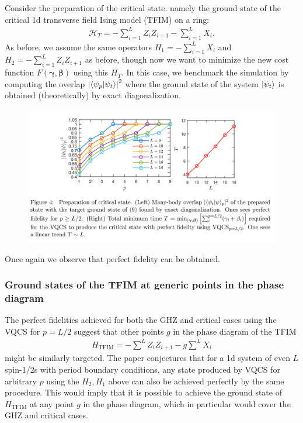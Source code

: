 \documentclass{book}
\theoremstyle{definition}
\newcommand{\had}{\mathcal{H}}
\begin{document}
Consider the preparation of the critical state. namely the ground state of the critical 1d transverse field Ising model (TFIM) on a ring:
\begin{align}
\had_T = -\sum^L_{i=1}Z_i Z_{i+1} - \sum^L_{i=1}X_i.
\end{align}
As before, we assume the same operators $H_1 = -\sum^L_{i=1}X_i$ and $H_2 = -\sum^L_{i=1} Z_i Z_{i+1}$ as before, though now we want to minimize the new cost function $F(\bm\gamma, \bm\beta)$ using this $H_T$. In this case, we benchmark the simulation by computing the overlap $\abs{\braket{\psi_p}{\psi_t}}^2$ where the ground state of the system $\ket{\psi_t}$ is obtained (theoretically) by exact diagonalization. \\
\begin{figure}[!htb]
	\centering
	\includegraphics[scale=0.25]{critical}
\end{figure}

Once again we observe that perfect fidelity can be obtained. 





\subsubsection{Ground states of the TFIM at generic points in the phase diagram}


The perfect fidelities achieved for both the GHZ and critical cases using the VQCS for $p = L/2$ suggest that other points $g$ in the phase diagram of the TFIM 
\begin{align}
H_{\text{TFIM}} = -\sum^L Z_i Z_{i+1} - g\sum^L X_i
\end{align}
might be similarly targeted. The paper conjectures that for a 1d system of even $L$ spin-1/2s with period boundary conditions, any state produced by VQCS for arbitrary $p$ using the $H_2, H_1$ above can also be achieved perfectly by the same procedure. This would imply that it is possible to achieve the ground state of $H_{\text{TFIM}}$ at any point $g$ in the phase diagram, which in particular would cover the GHZ and critical cases.   \\
\end{document}
